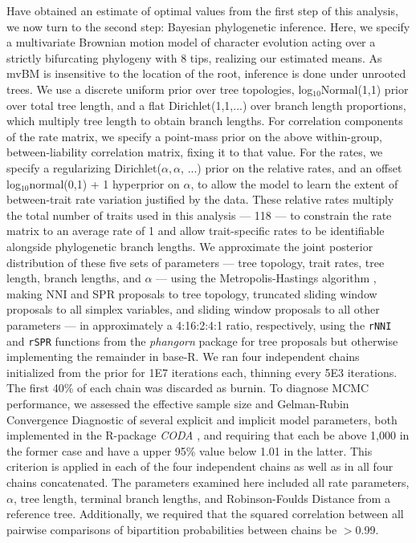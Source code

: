 \documentclass[10pt, twocolumn, twoside]{article}
\begin{document}
Have obtained an estimate of optimal values from the first step of this analysis, we now turn to the second step: Bayesian phylogenetic inference. Here, we specify a multivariate Brownian motion model of character evolution acting over a strictly bifurcating phylogeny with 8 tips, realizing our estimated means. As mvBM is insensitive to the location of the root, inference is done under unrooted trees. We use a discrete uniform prior over tree topologies, log$_{10}$Normal(1,1) prior over total tree length, and a flat Dirichlet(1,1,...) over branch length proportions, which multiply tree length to obtain branch lengths. For correlation components of the rate matrix, we specify a point-mass prior on the above within-group, between-liability correlation matrix, fixing it to that value. For the rates, we specify a regularizing Dirichlet($\alpha, \alpha$, ...) prior on the relative rates, and an offset log$_{10}$normal(0,1) + 1 hyperprior on $\alpha$, to allow the model to learn the extent of between-trait rate variation justified by the data. These relative rates multiply the total number of traits used in this analysis --- 118 --- to constrain the rate matrix to an average rate of 1 and allow trait-specific rates to be identifiable alongside phylogenetic branch lengths. We approximate the joint posterior distribution of these five sets of parameters --- tree topology, trait rates, tree length, branch lengths, and $\alpha$ --- using the Metropolis-Hastings algorithm \citep{hastingsMonteCarloSampling1970}, making NNI and SPR proposals to tree topology, truncated sliding window proposals to all simplex variables, and sliding window proposals to all other parameters --- in approximately a 4:16:2:4:1 ratio, respectively, using the \texttt{rNNI} and \texttt{rSPR} functions from the \textit{phangorn} \citep{schliepPhangornPhylogeneticAnalysis2011} package for tree proposals but otherwise implementing the remainder in base-R. We ran four independent chains initialized from the prior for 1E7 iterations each, thinning every 5E3 iterations. The first 40\% of each chain was discarded as burnin. To diagnose MCMC performance, we assessed the effective sample size and Gelman-Rubin Convergence Diagnostic \citep{gelmanInferenceIterativeSimulation1992} of several explicit and implicit model parameters, both implemented in the R-package \textit{CODA} \citep{plummerCODAConvergenceDiagnosis2006}, and requiring that each be above 1,000 in the former case and have a upper 95\% value below 1.01 in the latter. This criterion is applied in each of the four independent chains as well as in all four chains concatenated. The parameters examined here included all rate parameters, $\alpha$, tree length, terminal branch lengths, and Robinson-Foulds Distance \citep{robinsonComparisonPhylogeneticTrees1981} from a reference tree. Additionally, we required that the squared correlation between all pairwise comparisons of bipartition probabilities between chains be $>$0.99.
\end{document}
